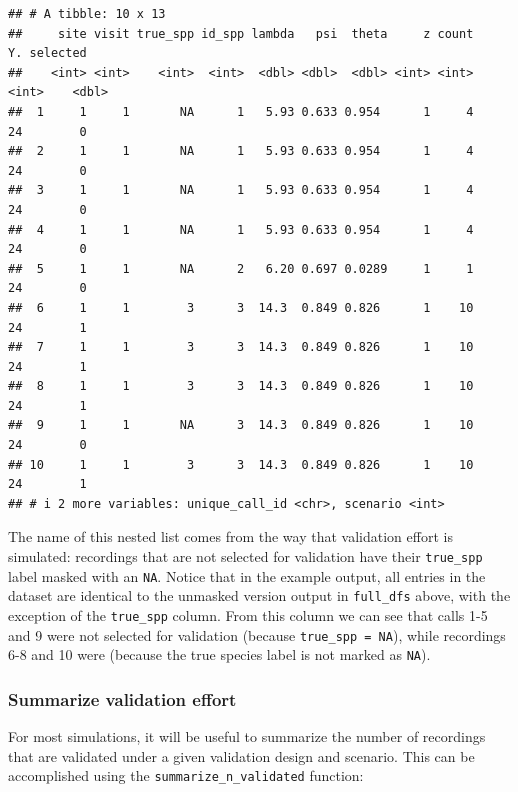\documentclass[
]{article}
\newenvironment{Shaded}{\begin{snugshade}}{\end{snugshade}}
\newcommand{\AttributeTok}[1]{\textcolor[rgb]{0.13,0.29,0.53}{#1}}
\newcommand{\DecValTok}[1]{\textcolor[rgb]{0.00,0.00,0.81}{#1}}
\newcommand{\FunctionTok}[1]{\textcolor[rgb]{0.13,0.29,0.53}{\textbf{#1}}}
\newcommand{\NormalTok}[1]{#1}
\newcommand{\SpecialCharTok}[1]{\textcolor[rgb]{0.81,0.36,0.00}{\textbf{#1}}}
\newcommand{\StringTok}[1]{\textcolor[rgb]{0.31,0.60,0.02}{#1}}
\begin{document}
\begin{verbatim}
## # A tibble: 10 x 13
##     site visit true_spp id_spp lambda   psi  theta     z count    Y. selected
##    <int> <int>    <int>  <int>  <dbl> <dbl>  <dbl> <int> <int> <int>    <dbl>
##  1     1     1       NA      1   5.93 0.633 0.954      1     4    24        0
##  2     1     1       NA      1   5.93 0.633 0.954      1     4    24        0
##  3     1     1       NA      1   5.93 0.633 0.954      1     4    24        0
##  4     1     1       NA      1   5.93 0.633 0.954      1     4    24        0
##  5     1     1       NA      2   6.20 0.697 0.0289     1     1    24        0
##  6     1     1        3      3  14.3  0.849 0.826      1    10    24        1
##  7     1     1        3      3  14.3  0.849 0.826      1    10    24        1
##  8     1     1        3      3  14.3  0.849 0.826      1    10    24        1
##  9     1     1       NA      3  14.3  0.849 0.826      1    10    24        0
## 10     1     1        3      3  14.3  0.849 0.826      1    10    24        1
## # i 2 more variables: unique_call_id <chr>, scenario <int>
\end{verbatim}

\linespread{1}

The name of this nested list comes from the way that validation effort is simulated: recordings that are not selected for validation have their \texttt{true\_spp} label masked with an \texttt{NA}. Notice that in the example output, all entries in the dataset are identical to the unmasked version output in \texttt{full\_dfs} above, with the exception of the \texttt{true\_spp} column. From this column we can see that calls 1-5 and 9 were not selected for validation (because \texttt{true\_spp\ =\ NA}), while recordings 6-8 and 10 were (because the true species label is not marked as \texttt{NA}).

\subsubsection{\texorpdfstring{Summarize validation effort \label{summarizeEffort}}{Summarize validation effort }}\label{summarize-validation-effort}

For most simulations, it will be useful to summarize the number of recordings that are validated under a given validation design and scenario. This can be accomplished using the \texttt{summarize\_n\_validated} function:

\linespread{1}

\begin{Shaded}
\end{Shaded}
\end{document}
